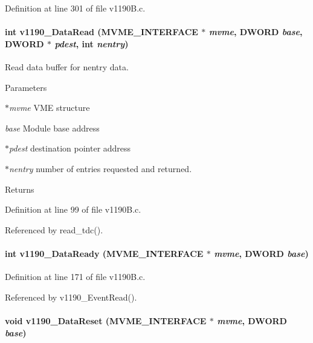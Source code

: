 Definition at line 301 of file v1190B.c.
\paragraph[{v1190\_\-DataRead}]{\setlength{\rightskip}{0pt plus 5cm}int v1190\_\-DataRead ({\bf MVME\_\-INTERFACE} $\ast$ {\em mvme}, \/  {\bf DWORD} {\em base}, \/  {\bf DWORD} $\ast$ {\em pdest}, \/  int {\em nentry})}\hfill\label{v1190B_8h_a3fb3376a4705f511733ade46e23388e3}
Read data buffer for nentry data. 
\begin{DoxyParams}{Parameters}
\item[{\em $\ast$mvme}]VME structure \item[{\em base}]Module base address \item[{\em $\ast$pdest}]destination pointer address \item[{\em $\ast$nentry}]number of entries requested and returned. \end{DoxyParams}
\begin{DoxyReturn}{Returns}

\end{DoxyReturn}


Definition at line 99 of file v1190B.c.

Referenced by read\_\-tdc().
\paragraph[{v1190\_\-DataReady}]{\setlength{\rightskip}{0pt plus 5cm}int v1190\_\-DataReady ({\bf MVME\_\-INTERFACE} $\ast$ {\em mvme}, \/  {\bf DWORD} {\em base})}\hfill\label{v1190B_8h_aff0189a9073aa7400603ee51fc2cc6b7}


Definition at line 171 of file v1190B.c.

Referenced by v1190\_\-EventRead().
\paragraph[{v1190\_\-DataReset}]{\setlength{\rightskip}{0pt plus 5cm}void v1190\_\-DataReset ({\bf MVME\_\-INTERFACE} $\ast$ {\em mvme}, \/  {\bf DWORD} {\em base})}\hfill\label{v1190B_8h_a0ee1716198b93671979a6fdead895f6e}
